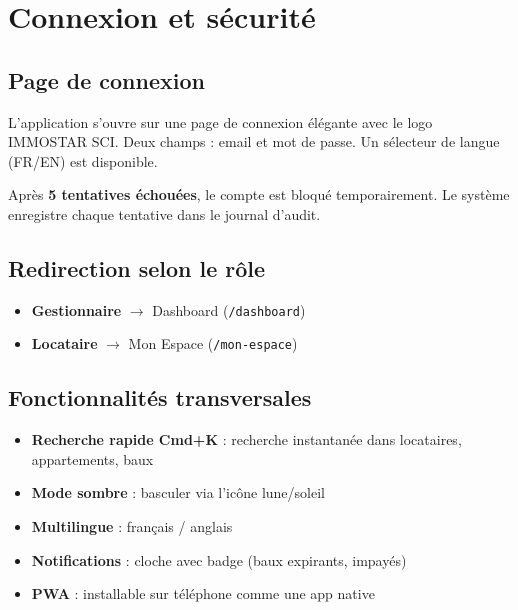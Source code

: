 \documentclass[12pt,a4paper]{article}
\begin{document}
\newpage
\section{Connexion et s\'ecurit\'e}

\subsection{Page de connexion}

L'application s'ouvre sur une page de connexion \'el\'egante avec le logo IMMOSTAR SCI. Deux champs : email et mot de passe. Un s\'electeur de langue (FR/EN) est disponible.

\begin{warnbox}
Apr\`es \textbf{5 tentatives \'echou\'ees}, le compte est bloqu\'e temporairement. Le syst\`eme enregistre chaque tentative dans le journal d'audit.
\end{warnbox}

\subsection{Redirection selon le r\^ole}
\begin{itemize}
\item \textbf{Gestionnaire} $\rightarrow$ Dashboard (\texttt{/dashboard})
\item \textbf{Locataire} $\rightarrow$ Mon Espace (\texttt{/mon-espace})
\end{itemize}

\subsection{Fonctionnalit\'es transversales}
\begin{itemize}
\item \textbf{Recherche rapide Cmd+K} : recherche instantan\'ee dans locataires, appartements, baux
\item \textbf{Mode sombre} : basculer via l'ic\^one lune/soleil
\item \textbf{Multilingue} : fran\c{c}ais / anglais
\item \textbf{Notifications} : cloche avec badge (baux expirants, impay\'es)
\item \textbf{PWA} : installable sur t\'el\'ephone comme une app native
\end{itemize}
\end{document}
